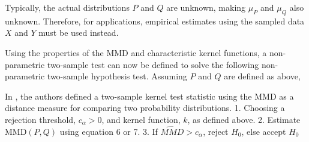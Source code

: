 

Typically, the actual distributions $P$ and $Q$ are unknown, making $\mu_P$ and $\mu_Q$ also unknown. Therefore, for applications, empirical estimates using the sampled data $X$ and $Y$ must be used instead. 


\iffalse
\hl{REWORD: We call the function that achieves the supremum, the witness function because it is the function that witnesses the difference in the two distributions. This means that we can interpret the witness function as showing where the estimated densities of
p and q are most different.}

The witness function 
\begin{equation}
f(x)=\mathbb{E}_{x^{\prime} \sim p}\left[k\left(x, x^{\prime}\right)\right]-\mathbb{E}_{x^{\prime} \sim q}\left[k\left(x, x^{\prime}\right)\right]
\end{equation}

which can also be estimated from finite samples of data by:
\begin{equation}
\hat{f}(x)=\frac{1}{m} \sum_{i=1}^{m} k\left(x, x_{i}\right)-\frac{1}{n} \sum_{i=1}^{n} k\left(x, y_{i}\right)
\end{equation}
Thus, as [need citation] points at, the witness function tracks where the densities of $X$ and $Y$ are most different. 
Kernel selection is important because it decides the kind of witness functions that can be learned. For most applications it is simply set to the RBF kernel but ideally it should be selected based on maximizing test power.
\fi 
 
Using the properties of the MMD and characteristic kernel functions, a non-parametric two-sample test can now be defined to solve the following non-parametric two-sample hypothesis test. Assuming $P$ and $Q$ are defined as above, 

In \cite{gretton2012kernel}, the authors defined a two-sample kernel test statistic using the MMD as a distance measure for comparing two probability distributions. 
1. Choosing a rejection threshold, $c_\alpha > 0$, and kernel function, $k$, as defined above.
2. Estimate MMD$(P,Q)$ using equation 6 or 7.
3. If $\hat{MMD} > c_\alpha$, reject $H_0$, else accept $H_0$

